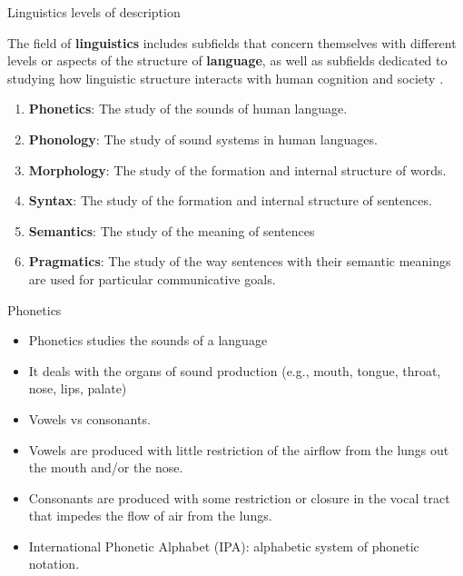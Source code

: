 \documentclass[handout]{beamer}
\begin{document}
\begin{frame}{Linguistics levels of description}
\begin{scriptsize}
The field of \textbf{linguistics} includes subfields that concern themselves with different levels or aspects of the structure of \textbf{language}, as well as subfields dedicated to studying how linguistic structure interacts with human cognition and society \cite{bender2013linguistic}.
\begin{enumerate}
 \item \textbf{Phonetics}: The study of the sounds of human language.
 \item \textbf{Phonology}: The study of sound systems in human languages.
 \item \textbf{Morphology}: The study of the formation and internal structure of words.
 \item \textbf{Syntax}: The study of the formation and internal structure of sentences.
 \item \textbf{Semantics}: The study of the meaning of sentences
 \item \textbf{Pragmatics}: The study of the way sentences with their semantic meanings are
used for particular communicative goals.
\end{enumerate}


\end{scriptsize}
\end{frame}



\begin{frame}{Phonetics}
\scriptsize{
\begin{itemize}
 \item Phonetics studies the sounds of a language \cite{JohnsonMLSS}
 \item It deals with the organs of sound production (e.g., mouth, tongue, throat, nose, lips, palate)
\item Vowels vs consonants.
\item Vowels are produced with little restriction of the airflow from the lungs out
the mouth and/or the nose. \cite{fromkin2018introduction}
\item Consonants are produced with some restriction or closure in the vocal tract that
impedes the flow of air from the lungs. \cite{fromkin2018introduction}
\item International Phonetic Alphabet (IPA):  alphabetic system of phonetic notation. 
\end{itemize}
}
\end{frame}
\end{document}
